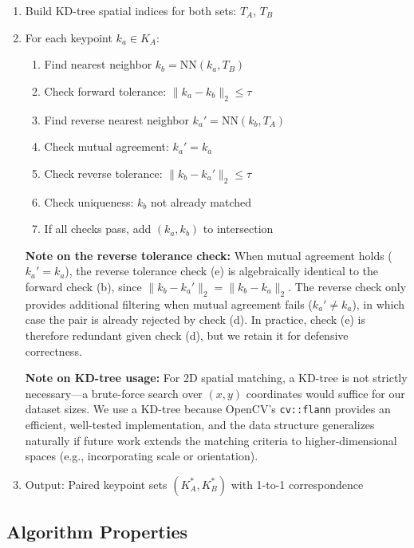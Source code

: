 \begin{enumerate}
    \item Build KD-tree spatial indices for both sets: $T_A$, $T_B$

    \item For each keypoint $k_a \in K_A$:
    \begin{enumerate}
        \item Find nearest neighbor $k_b = \text{NN}(k_a, T_B)$
        \item Check forward tolerance: $\|k_a - k_b\|_2 \leq \tau$
        \item Find reverse nearest neighbor $k_a' = \text{NN}(k_b, T_A)$
        \item Check mutual agreement: $k_a' = k_a$
        \item Check reverse tolerance: $\|k_b - k_a'\|_2 \leq \tau$
        \item Check uniqueness: $k_b$ not already matched
        \item If all checks pass, add $(k_a, k_b)$ to intersection
    \end{enumerate}

    \textbf{Note on the reverse tolerance check:} When mutual agreement holds ($k_a' = k_a$), the reverse tolerance check (e) is algebraically identical to the forward check (b), since $\|k_b - k_a'\|_2 = \|k_b - k_a\|_2$. The reverse check only provides additional filtering when mutual agreement fails ($k_a' \neq k_a$), in which case the pair is already rejected by check (d). In practice, check (e) is therefore redundant given check (d), but we retain it for defensive correctness.

    \textbf{Note on KD-tree usage:} For 2D spatial matching, a KD-tree is not strictly necessary---a brute-force search over $(x, y)$ coordinates would suffice for our dataset sizes. We use a KD-tree because OpenCV's \texttt{cv::flann} provides an efficient, well-tested implementation, and the data structure generalizes naturally if future work extends the matching criteria to higher-dimensional spaces (e.g., incorporating scale or orientation).

    \item Output: Paired keypoint sets $(K_A^*, K_B^*)$ with 1-to-1 correspondence
\end{enumerate}

\subsection{Algorithm Properties}

